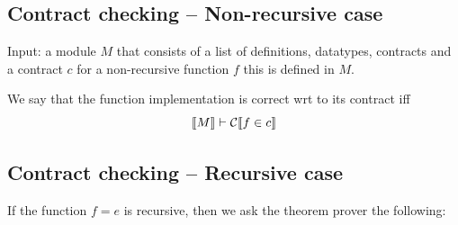 \documentclass[preprint]{sigplanconf}
\begin{document}
\subsection{Contract checking -- Non-recursive case}
Input: a module $M$ that consists of a list of definitions, datatypes,
contracts and a contract $c$ for a non-recursive function $f$ this is
defined in $M$.

We say that the function implementation is correct wrt to its contract
iff $$\llbracket M \rrbracket \vdash \mathcal{C} \llbracket f \in c \rrbracket$$

\subsection{Contract checking -- Recursive case}\label{sec:recursiveContracts}
If the function $f=e$ is recursive, then we ask the theorem prover the
following:
\end{document}
